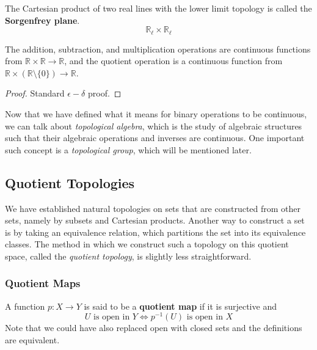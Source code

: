   \begin{example}
    The Cartesian product of two real lines with the lower limit topology is called the \textbf{Sorgenfrey plane}. 
    \begin{equation}
      \mathbb{R}_\ell \times \mathbb{R}_\ell
    \end{equation}
  \end{example}

  \begin{lemma}
    The addition, subtraction, and multiplication operations are continuous functions from $\mathbb{R} \times \mathbb{R} \longrightarrow \mathbb{R}$, and the quotient operation is a continuous function from $\mathbb{R} \times (\mathbb{R} \setminus \{0\}) \longrightarrow \mathbb{R}$. 
  \end{lemma}
  \begin{proof}
    Standard $\epsilon-\delta$ proof. 
  \end{proof}

  Now that we have defined what it means for binary operations to be continuous, we can talk about \textit{topological algebra}, which is the study of algebraic structures such that their algebraic operations and inverses are continuous. One important such concept is a \textit{topological group}, which will be mentioned later. 

\subsection{Quotient Topologies} 

  We have established natural topologies on sets that are constructed from other sets, namely by subsets and Cartesian products. Another way to construct a set is by taking an equivalence relation, which partitions the set into its equivalence classes. The method in which we construct such a topology on this quotient space, called the \textit{quotient topology}, is slightly less straightforward.  

  \subsubsection{Quotient Maps}

    \begin{definition}
      A function $p: X \rightarrow Y$ is said to be a \textbf{quotient map} if it is surjective and 
      \begin{equation}
        U \text{ is open in } Y \iff p^{-1}(U) \text{ is open in } X
      \end{equation} 
      Note that we could have also replaced open with closed sets and the definitions are equivalent. 
    \end{definition}

